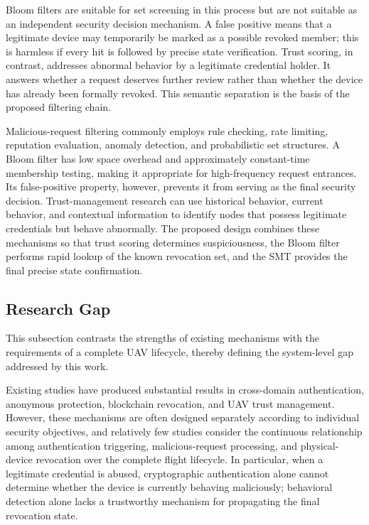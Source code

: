 \documentclass[lettersize,journal]{IEEEtran}
\begin{document}
	Bloom filters are suitable for set screening in this process but are not suitable as an independent security decision mechanism. A false positive means that a legitimate device may temporarily be marked as a possible revoked member; this is harmless if every hit is followed by precise state verification. Trust scoring, in contrast, addresses abnormal behavior by a legitimate credential holder. It answers whether a request deserves further review rather than whether the device has already been formally revoked. This semantic separation is the basis of the proposed filtering chain.
	
	Malicious-request filtering commonly employs rule checking, rate limiting, reputation evaluation, anomaly detection, and probabilistic set structures. A Bloom filter has low space overhead and approximately constant-time membership testing, making it appropriate for high-frequency request entrances. Its false-positive property, however, prevents it from serving as the final security decision. Trust-management research can use historical behavior, current behavior, and contextual information to identify nodes that possess legitimate credentials but behave abnormally. The proposed design combines these mechanisms so that trust scoring determines suspiciousness, the Bloom filter performs rapid lookup of the known revocation set, and the SMT provides the final precise state confirmation.
	
	\subsection{Research Gap}
	This subsection contrasts the strengths of existing mechanisms with the requirements of a complete UAV lifecycle, thereby defining the system-level gap addressed by this work.
	
	
	Existing studies have produced substantial results in cross-domain authentication, anonymous protection, blockchain revocation, and UAV trust management. However, these mechanisms are often designed separately according to individual security objectives, and relatively few studies consider the continuous relationship among authentication triggering, malicious-request processing, and physical-device revocation over the complete flight lifecycle. In particular, when a legitimate credential is abused, cryptographic authentication alone cannot determine whether the device is currently behaving maliciously; behavioral detection alone lacks a trustworthy mechanism for propagating the final revocation state.
	
\end{document}

